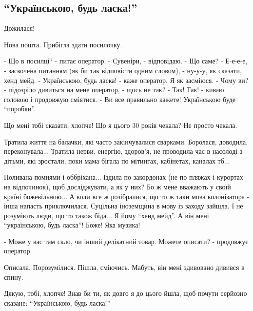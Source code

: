  
 
 
 
 
 
\subsection{\enquote{Українською, будь ласка!}}
\label{sec:25_11_2020.fb.nitsoi_larysa.1.nova_poshta}

Дожилася!

Нова пошта. Прибігла здати посилочку.

	\obeycr
- Що в посилці? - питає оператор.
- Сувеніри, - відповідаю.
- Що саме?
- Е-е-е-е, - заскочена питанням (як би так відповісти одним словом), - ну-у-у, як сказати, хенд мейд.
- Українською, будь ласка! - каже оператор.
Я як засміюся.
- Чому ви? - підозріло дивиться на мене оператор, - щось не так?
- Так! Так! - киваю головою і продовжую сміятися. - Ви все правильно кажете! Українською буде \enquote{поробки}.
	\restorecr

Що мені тобі сказати, хлопче! Що я цього 30 років чекала? Не просто чекала.

Тратила життя на балачки, які часто закінчувалися сварками. Боролася, доводила,
переконувала...  Тратила нерви, енергію, здоров'я, не проводила час в насолоді
з дітьми, які зростали, поки мама бігала по мітингах, кабінетах, каналах тб...

Поливана помиями і оббріхана... Їздила по закордонах (не по пляжах і курортах
на відпочинок), щоб досліджувати, а як у них? Бо ж мене вважають у своїй країні
божевільною... А коли все ж розібралися, що то ж таки мова колонізатора - інша
напасть приключилася. Суцільна іноземщина в мову із заходу зайшла. І не
розуміють люди, що то також біда...  Я йому \enquote{хенд мейд}. А він мені
\enquote{українською, будь ласка}! Боже! Яка музика!

- Може у вас там скло, чи інший делікатний товар. Можете описати? - продовжує оператор.

Описала. Порозумілися. Пішла, сміючись. Мабуть, він мені здивовано дивився в спину. 

Дякую, тобі, хлопче! Знав би ти, як довго я до цього йшла, щоб почути серйозно сказане: \enquote{Українською, будь ласка!}

